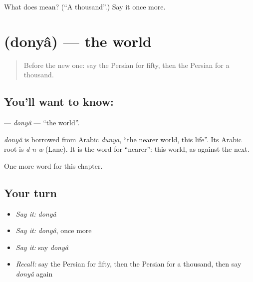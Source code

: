 \begin{tcolorbox}[breakable,colback=teal!4,colframe=teal!35!black,title={Before you move on}]
What does  mean? (\textquotedblleft{}A thousand\textquotedblright{}.) Say it once more.
\end{tcolorbox}
\section[\texorpdfstring{\fa{دنیا} (donyâ)}{دنیا (donyâ)}]{ (donyâ) — the world}

\label{lesson:FA-C77-donya}



\begin{quote}
Before the new one: say the Persian for fifty, then the Persian for a thousand.
\end{quote}

\subsection*{You'll want to know: }
\textbf{} — \emph{donyâ} — \textquotedblleft{}the world\textquotedblright{}.

\begin{cousinweb}
\emph{donyâ} is borrowed from Arabic \emph{dunyā}, \textquotedblleft{}the nearer world, this life\textquotedblright{}. Its Arabic root is \emph{d-n-w} (Lane). It is the word for \textquotedblleft{}nearer\textquotedblright{}: this world, as against the next.
\end{cousinweb}

\begin{grammarlens}[title={What you've built}]
One more word for this chapter.
\end{grammarlens}

\subsection*{Your turn}
\begin{itemize}
\raggedright
  \item \emph{Say it:} \emph{donyâ}
  \item \emph{Say it:} \emph{donyâ}, once more
  \item \emph{Say it:} say \emph{donyâ}
  \item \emph{Recall:} say the Persian for fifty, then the Persian for a thousand, then say \emph{donyâ} again
\end{itemize}

